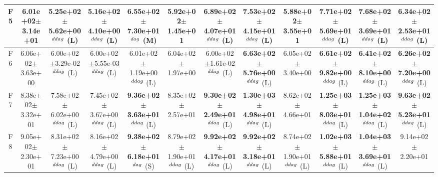 \begin{table}[!t]
\begin{tabular}{c|ccccccccccc}
F5  & 6.01e+02$\pm$3.14e+01  & 5.25e+02$\pm$5.62e+00$^{\\ddag}$ (L)  & 5.16e+02$\pm$4.10e+00$^{\\ddag}$ (L)  & \textbf{6.55e+02$\pm$7.30e+01}$^{\\dag}$ (M)  & 5.92e+02$\pm$1.45e+01   & \textbf{6.89e+02$\pm$4.07e+01}$^{\\ddag}$ (L)  & \textbf{7.53e+02$\pm$4.15e+01}$^{\\ddag}$ (L)  & 5.88e+02$\pm$3.55e+01   & \textbf{7.71e+02$\pm$5.69e+01}$^{\\ddag}$ (L)  & \textbf{7.68e+02$\pm$3.69e+01}$^{\\ddag}$ (L)  & \textbf{6.34e+02$\pm$2.53e+01}$^{\\ddag}$ (L) \\ \hline
F6  & 6.06e+02$\pm$3.63e+00  & 6.00e+02$\pm$3.29e-02$^{\\ddag}$ (L)  & 6.00e+02$\pm$5.55e-03$^{\\ddag}$ (L)  & 6.01e+02$\pm$1.19e+00$^{\\ddag}$ (L)  & 6.04e+02$\pm$1.97e+00   & 6.00e+02$\pm$1.61e-02$^{\\ddag}$ (L)  & \textbf{6.63e+02$\pm$5.76e+00}$^{\\ddag}$ (L)  & 6.05e+02$\pm$3.40e+00   & \textbf{6.61e+02$\pm$9.82e+00}$^{\\ddag}$ (L)  & \textbf{6.41e+02$\pm$8.10e+00}$^{\\ddag}$ (L)  & \textbf{6.26e+02$\pm$7.20e+00}$^{\\ddag}$ (L) \\ \hline
F7  & 8.38e+02$\pm$3.32e+01  & 7.58e+02$\pm$6.02e+00$^{\\ddag}$ (L)  & 7.45e+02$\pm$3.67e+00$^{\\ddag}$ (L)  & \textbf{9.36e+02$\pm$3.63e+01}$^{\\ddag}$ (L)  & 8.35e+02$\pm$2.57e+01   & \textbf{9.30e+02$\pm$2.49e+01}$^{\\ddag}$ (L)  & \textbf{1.30e+03$\pm$4.98e+01}$^{\\ddag}$ (L)  & 8.62e+02$\pm$4.66e+01   & \textbf{1.25e+03$\pm$8.03e+01}$^{\\ddag}$ (L)  & \textbf{1.25e+03$\pm$1.04e+02}$^{\\ddag}$ (L)  & \textbf{9.63e+02$\pm$5.23e+01}$^{\\ddag}$ (L) \\ \hline
F8  & 9.05e+02$\pm$2.30e+01  & 8.31e+02$\pm$7.23e+00$^{\\ddag}$ (L)  & 8.16e+02$\pm$4.79e+00$^{\\ddag}$ (L)  & \textbf{9.38e+02$\pm$6.18e+01}$^{\\dag}$ (S)  & 8.79e+02$\pm$1.90e+01$^{\\ddag}$ (L)  & \textbf{9.92e+02$\pm$4.17e+01}$^{\\ddag}$ (L)  & \textbf{9.92e+02$\pm$3.18e+01}$^{\\ddag}$ (L)  & 8.74e+02$\pm$1.90e+01$^{\\ddag}$ (L)  & \textbf{1.02e+03$\pm$5.88e+01}$^{\\ddag}$ (L)  & \textbf{1.04e+03$\pm$3.69e+01}$^{\\ddag}$ (L)  & 9.14e+02$\pm$2.20e+01  \\ \hline

\end{tabular}
\end{table}
